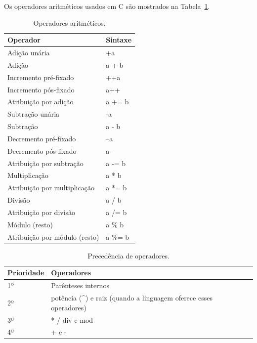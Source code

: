 \documentclass[11pt,fleqn]{book} %
\begin{document}
Os operadores aritméticos usados em C são mostrados na Tabela~\ref{tab:opareadores_aritmeticos}.
\begin{table}[htbp]
	\centering
	\caption{Operadores aritméticos.}
	\label{tab:opareadores_aritmeticos}
		\begin{tabular}{@{}ll@{}}
			\toprule
			\textbf{Operador}             & \textbf{Sintaxe} \\ \midrule
			Adição unária                 & +a               \\
			Adição                        & a + b            \\
			Incremento pré-fixado         & ++a              \\
			Incremento pós-fixado         & a++              \\
			Atribuição por adição         & a += b           \\
			Subtração unária              & -a               \\
			Subtração                     & a - b            \\
			Decremento pré-fixado         & --a              \\
			Decremento pós-fixado         & a--              \\
			Atribuição por subtração      & a -= b           \\
			Multiplicação                 & a * b            \\
			Atribuição por multiplicação  & a *= b           \\
			Divisão                       & a / b            \\
			Atribuição por divisão        & a /= b           \\
			Módulo (resto)                & a \% b           \\
			Atribuição por módulo (resto) & a \%= b          \\ \bottomrule
		\end{tabular}%
\end{table}
\begin{table}[htb]
	\centering
	\caption{Precedência de operadores.}
	\label{tab:prioridade_operadores}
		\begin{tabular}{@{}ll@{}}
			\toprule
			\textbf{Prioridade} & \textbf{Operadores}                                                                \\ \midrule
			1º                  & Parênteses internos                                                                \\
			2º                  & potência (\textasciicircum{}) e raiz (quando a linguagem oferece esses operadores) \\
			3º                  & * / div e mod                                                                      \\
			4º                  & + e -                                                                              \\ \bottomrule
		\end{tabular}%
\end{table}
\end{document}
